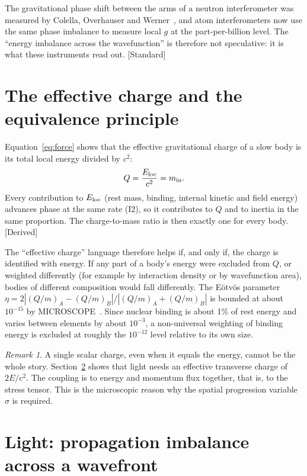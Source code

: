 \documentclass[11pt]{article}
\newcommand{\sgP}{\sigma}
\newcommand{\Eloc}{E_{\rm loc}}
\newcommand{\st}[1]{\textsf{\small[#1]}}
\theoremstyle{plain}
\theoremstyle{remark}
\newtheorem{remark}{Remark}
\begin{document}
The gravitational phase shift between the arms of a neutron interferometer was measured by Colella, Overhauser and Werner~\cite{COW1975}, and atom interferometers now use the same phase imbalance to measure local $g$ at the part-per-billion level. The ``energy imbalance across the wavefunction'' is therefore not speculative: it is what these instruments read out. \st{Standard}

\section{The effective charge and the equivalence principle}
\label{sec:charge}

Equation~\eqref{eq:force} shows that the effective gravitational charge of a slow body is its total local energy divided by $c^2$:
\begin{equation}
Q=\frac{\Eloc}{c^2}=m_{\rm in}.
\end{equation}
Every contribution to $\Eloc$ (rest mass, binding, internal kinetic and field energy) advances phase at the same rate (I2), so it contributes to $Q$ and to inertia in the same proportion. The charge-to-mass ratio is then exactly one for every body. \st{Derived}

The ``effective charge'' language therefore helps if, and only if, the charge is identified with energy. If any part of a body's energy were excluded from $Q$, or weighted differently (for example by interaction density or by wavefunction area), bodies of different composition would fall differently. The E\"otv\"os parameter $\eta=2|(Q/m)_A-(Q/m)_B|/|(Q/m)_A+(Q/m)_B|$ is bounded at about $10^{-15}$ by MICROSCOPE~\cite{Touboul2022}. Since nuclear binding is about 1\% of rest energy and varies between elements by about $10^{-3}$, a non-universal weighting of binding energy is excluded at roughly the $10^{-12}$ level relative to its own size.

\begin{remark}
A single scalar charge, even when it equals the energy, cannot be the whole story. Section~\ref{sec:light} shows that light needs an effective transverse charge of $2E/c^2$. The coupling is to energy and momentum flux together, that is, to the stress tensor. This is the microscopic reason why the spatial progression variable $\sgP$ is required.
\end{remark}

\section{Light: propagation imbalance across a wavefront}
\label{sec:light}
\end{document}
